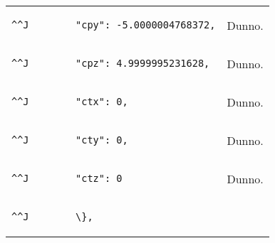 \documentclass[12pt,a4paper,openany,oneside,oldfontcommands]{memoir}
\begin{document}
\begin{tabularx}{\textwidth}{p{8cm} X}
\begin{lstlisting}^^J        "cpy": -5.0000004768372,\end{lstlisting}    & Dunno. \\
\begin{lstlisting}^^J        "cpz": 4.9999995231628,\end{lstlisting}    & Dunno. \\
\begin{lstlisting}^^J        "ctx": 0,\end{lstlisting}    & Dunno. \\
\begin{lstlisting}^^J        "cty": 0,\end{lstlisting}    & Dunno. \\
\begin{lstlisting}^^J        "ctz": 0\end{lstlisting}    & Dunno. \\
\begin{lstlisting}^^J        \},\end{lstlisting}    & \\
	\bottomrule
\end{tabularx}
\end{document}

